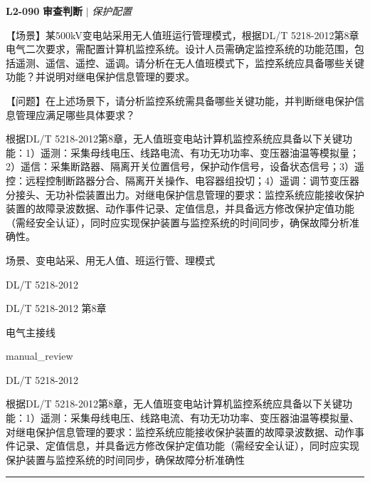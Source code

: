 \documentclass[11pt,a4paper]{ctexart}
\begin{document}
\noindent\textbf{L2-090} \hfill \textbf{审查判断} $|$ \textit{保护配置}
\begin{description}[leftmargin=1.5em,style=nextline,font=\normalfont]
  \item[Q:] 【场景】某500kV变电站采用无人值班运行管理模式，根据DL/T 5218-2012第8章电气二次要求，需配置计算机监控系统。设计人员需确定监控系统的功能范围，包括遥测、遥信、遥控、遥调。请分析在无人值班模式下，监控系统应具备哪些关键功能？并说明对继电保护信息管理的要求。

【问题】在上述场景下，请分析监控系统需具备哪些关键功能，并判断继电保护信息管理应满足哪些具体要求？
  \item[A:] 根据DL/T 5218-2012第8章，无人值班变电站计算机监控系统应具备以下关键功能：1）遥测：采集母线电压、线路电流、有功无功功率、变压器油温等模拟量；2）遥信：采集断路器、隔离开关位置信号，保护动作信号，设备状态信号；3）遥控：远程控制断路器分合、隔离开关操作、电容器组投切；4）遥调：调节变压器分接头、无功补偿装置出力。对继电保护信息管理的要求：监控系统应能接收保护装置的故障录波数据、动作事件记录、定值信息，并具备远方修改保护定值功能（需经安全认证），同时应实现保护装置与监控系统的时间同步，确保故障分析准确性。
  \item[KW:] 场景、变电站采、用无人值、班运行管、理模式
  \item[标准:] DL/T 5218-2012
  \item[条款溯源:] DL/T 5218-2012 第8章
  \item[主题:] 电气主接线
  \item[评分方式:] manual\_review
  \item[Rubric条款:] DL/T 5218-2012
  \item[Rubric判据:] 根据DL/T 5218-2012第8章，无人值班变电站计算机监控系统应具备以下关键功能：1）遥测：采集母线电压、线路电流、有功无功功率、变压器油温等模拟量、对继电保护信息管理的要求：监控系统应能接收保护装置的故障录波数据、动作事件记录、定值信息，并具备远方修改保护定值功能（需经安全认证），同时应实现保护装置与监控系统的时间同步，确保故障分析准确性

\end{description}
\vspace{4pt}
\hrule
\vspace{6pt}
\end{document}
